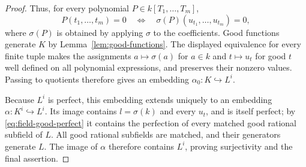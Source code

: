 \begin{proof}
Thus, for every polynomial \(P\in k[T_1,\ldots,T_m]\),
\[
 P(t_1,\ldots,t_m)=0
 \quad\Longleftrightarrow\quad
 \sigma(P)(u_{t_1},\ldots,u_{t_m})=0,
\]
where \(\sigma(P)\) is obtained by applying \(\sigma\) to the coefficients.
Good functions generate \(K\) by Lemma~\ref{lem:good-functions}.
The displayed equivalence for every finite tuple makes the assignments
\(a\mapsto\sigma(a)\) for \(a\in k\) and \(t\mapsto u_t\) for good \(t\)
well defined on all polynomial expressions, and preserves their nonzero
values.  Passing to quotients therefore gives an embedding
\(\alpha_0:K\hookrightarrow L^i\).

Because \(L^i\) is perfect, this embedding extends uniquely to an embedding
\(\alpha:K^i\hookrightarrow L^i\).  Its image contains \(l=\sigma(k)\)
and every \(u_t\), and is itself perfect; by
\eqref{eq:field-good-perfect} it contains the perfection of every matched
good rational subfield of \(L\).
All good rational subfields are matched, and their generators generate
\(L\).  The image of \(\alpha\) therefore contains \(L^i\), proving
surjectivity and the final assertion.
\end{proof}
